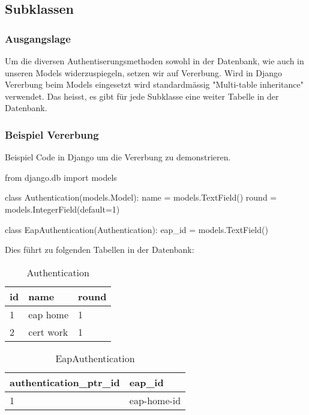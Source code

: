 \subsection{Subklassen}
\subsubsection{Ausgangslage}
Um die diversen Authentiserungsmethoden sowohl in der Datenbank, wie auch in unseren Models widerzuspiegeln, setzen wir auf Vererbung. Wird in Django Vererbung beim Models eingesetzt wird standardmässig "Multi-table inheritance" verwendet. Das heisst, es gibt für jede Subklasse eine weiter Tabelle in der Datenbank.

\subsubsection{Beispiel Vererbung}
Beispiel Code in Django um die Vererbung zu demonstrieren.
\medskip
\begin{python}
from django.db import models

class Authentication(models.Model):
    name = models.TextField()
    round = models.IntegerField(default=1)

class EapAuthentication(Authentication):
    eap_id = models.TextField()
\end{python}

\medskip
Dies führt zu folgenden Tabellen in der Datenbank:\\

\begin{table}[H]
	\centering
    \begin{tabular}{|p{3cm}|p{3cm}|p{3cm}|}
    \hline    
    \rowcolor{lightblue}
	id & name & round \\ \hline   
	1 & eap home & 1 \\ \hline
	2 & cert work & 1 \\ \hline
    \end{tabular}
    \caption[Authentication]{Authentication}
\end{table}
\vspace*{1 cm}
\begin{table}[H]
	\centering
    \begin{tabular}{|p{4.5cm}|p{4.5cm}|}
    \hline    
    \rowcolor{lightblue}
	authentication\_ptr\_id & eap\_id \\ \hline   
	1 & eap-home-id  \\ \hline
    \end{tabular}
    \caption[EapAuthentication]{EapAuthentication}
\end{table}
\medskip

